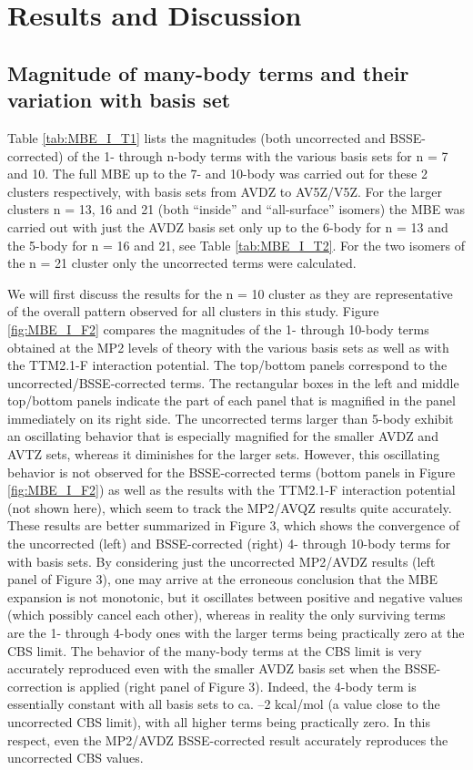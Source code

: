 \documentclass [11pt, proquest] {uwthesis}[2020/02/24]
\begin{document}
\section{Results and Discussion}
\subsection{Magnitude of many-body terms and their variation with basis set}

\par Table \ref{tab:MBE_I_T1} lists the magnitudes (both uncorrected and BSSE-corrected) of the 1- through n-body terms with the various basis sets for n = 7 and 10. The full MBE up to the 7- and 10-body was carried out for these 2 clusters respectively, with basis sets from AVDZ to AV5Z/V5Z. For the larger clusters n = 13, 16 and 21 (both “inside” and “all-surface” isomers) the MBE was carried out with just the AVDZ basis set only up to the 6-body for n = 13 and the 5-body for n = 16 and 21, see Table \ref{tab:MBE_I_T2}. For the two isomers of the n = 21 cluster only the uncorrected terms were calculated.

\par We will first discuss the results for the n = 10 cluster as they are representative of the overall pattern observed for all clusters in this study. Figure \ref{fig:MBE_I_F2} compares the magnitudes of the 1- through 10-body terms obtained at the MP2 levels of theory with the various basis sets as well as with the TTM2.1-F interaction potential. The top/bottom panels correspond to the uncorrected/BSSE-corrected terms. The rectangular boxes in the left and middle top/bottom panels indicate the part of each panel that is magnified in the panel immediately on its right side. The uncorrected terms larger than 5-body exhibit an oscillating behavior that is especially magnified for the smaller AVDZ and AVTZ sets, whereas it diminishes for the larger sets. However, this oscillating behavior is not observed for the BSSE-corrected terms (bottom panels in Figure \ref{fig:MBE_I_F2}) as well as the results with the TTM2.1-F interaction potential (not shown here), which seem to track the MP2/AVQZ results quite accurately. These results are better summarized in Figure 3, which shows the convergence of the uncorrected (left) and BSSE-corrected (right) 4- through 10-body terms for  with basis sets. By considering just the uncorrected MP2/AVDZ results (left panel of Figure 3), one may arrive at the erroneous conclusion that the MBE expansion is not monotonic, but it oscillates between positive and negative values (which possibly cancel each other), whereas in reality the only surviving terms are the 1- through 4-body ones with the larger terms being practically zero at the CBS limit. The behavior of the many-body terms at the CBS limit is very accurately reproduced even with the smaller AVDZ basis set when the BSSE-correction is applied (right panel of Figure 3). Indeed, the 4-body term is essentially constant with all basis sets to ca. –2 kcal/mol (a value close to the uncorrected CBS limit), with all higher terms being practically zero. In this respect, even the MP2/AVDZ BSSE-corrected result accurately reproduces the uncorrected CBS values.
\end{document}
